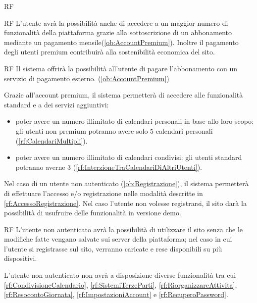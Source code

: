 \begin{listaPersonale}{RF}
\begin{listaPersonale2}{RF}
		 L'utente avrà la possibilità anche di accedere a un maggior numero di funzionalità della piattaforma grazie alla sottoscrizione di un abbonamento mediante un pagamento mensile(\ref{ob:AccountPremium}). Inoltre il pagamento degli utenti premium contribuirà alla sostenibilità economica del sito.

		\begin{listaPersonale3}{RF}
			 Il sistema offrirà la possibilità all'utente di pagare l'abbonamento con un servizio di pagamento esterno. (\ref{ob:AccountPremium})

			 Grazie all'account premium, il sistema permetterà di accedere alle funzionalità standard e a dei servizi aggiuntivi:
			\begin{itemize}
				\item poter avere un numero illimitato di calendari personali in base allo loro scopo: gli utenti non premium potranno avere solo 5 calendari personali (\ref{rf:CalendariMultipli}).
				\item poter avere un numero illimitato di calendari condivisi: gli utenti standard potranno averne 3 (\ref{rf:InterzioneTraCalendariDiAltriUtenti}).
			\end{itemize}

		\end{listaPersonale3}
	\end{listaPersonale2}

	 Nel caso di un utente non autenticato (\ref{ob:Registrazione}), il sistema permetterà di effettuare l'accesso e/o registrazione nelle modalità descritte in \ref{rf:AccessoRegistrazione}. Nel caso l'utente non volesse registrarsi, il sito darà la possibilità di usufruire delle funzionalità in versione demo.

	\begin{listaPersonale2}{RF}
			L'utente non autenticato avrà la possibilità di utilizzare il sito senza che le modifiche fatte vengano salvate sui server della piattaforma; nel caso in cui l'utente si registrasse sul sito, verranno caricate e rese disponibili su più dispositivi.

		\begin{listaPersonale3}{}
			 L'utente non autenticato non avrà a disposizione diverse funzionalità tra cui \ref{rf:CondivisioneCalendario}, \ref{rf:SistemiTerzeParti}, \ref{rf:RiorganizzareAttivita}, \ref{rf:ResocontoGiornata}, \ref{rf:ImpostazioniAccount} e \ref{rf:RecuperoPassword}.
		\end{listaPersonale3}
	\end{listaPersonale2}


\end{listaPersonale}
